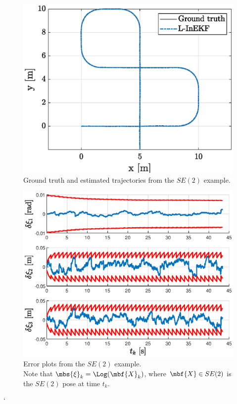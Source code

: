 \documentclass[nobib, nofonts, notoc]{tufte-handout}
\begin{document}
    \begin{figure}[h]
        \centering
        \includegraphics[width=\textwidth]{figs/se2_example_trajectories.eps}
        \caption{Ground truth and estimated trajectories from the $SE(2)$ example.}
        \label{fig:se2_example_trajectories}
    \end{figure}

    \begin{figure}[h]
        \centering
        \includegraphics[width=\textwidth]{figs/se2_example_error_plots.eps}
        \caption{Error plots from the $SE(2)$ example.\\ Note that $\mbs{\xi}_{k} = \Log(\mbf{X}_{k})$, where $\mbf{X}\in SE(2)$ is the $SE(2)$ pose at time $t_{k}$.}
        \label{fig:se2_example_error_plots}
    \end{figure}

    \clearpage`
    \begin{appendices}
        
    \end{appendices}

    \clearpage
    
    
\end{document}
